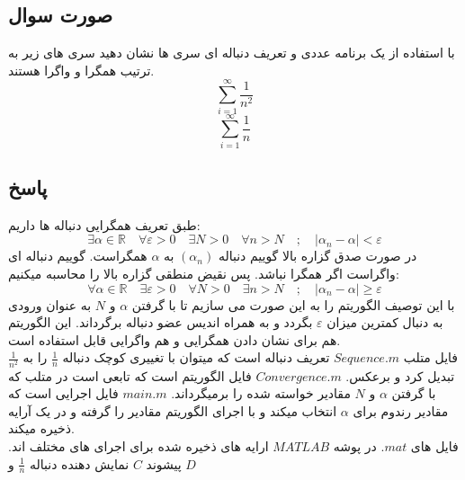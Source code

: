 \documentclass[12pt, letterpaper]{article}
\begin{document}
\subsection{صورت سوال}
با استفاده از یک برنامه عددی و تعریف دنباله ای سری ها نشان دهید سری های زیر به ترتیب همگرا و واگرا هستند.
\[ \sum_{i=1}^{\infty} \frac {1}{n^2}\]
\[ \sum_{i=1}^{\infty} \frac {1}{n}\]



\subsection{پاسخ}

طبق تعریف همگرایی دنباله ها داریم:
\[\exists \! \alpha\! \in\! \mathbb{R} \quad \forall \varepsilon \! > \! 0 \quad \exists N\! > \! 0 \quad \forall n\! >\! N\quad ; \quad \big| \alpha_{n} - \alpha \big|\! <\! \varepsilon \]
در صورت صدق گزاره بالا گوییم دنباله 
\((\alpha_{n})\)
به 
$\alpha$
همگراست. گوییم دنباله ای واگراست اگر همگرا نباشد. پس نقیض منطقی گزاره بالا را محاسبه میکنیم:
\[\forall \! \alpha\! \in\! \mathbb{R} \quad \exists \varepsilon \! > \! 0 \quad \forall N\! > \! 0 \quad \exists n\! >\! N\quad ; \quad \big| \alpha_{n} - \alpha \big|\! \ge\! \varepsilon \]
با این توصیف الگوریتم را به این صورت می سازیم تا با گرفتن 
$\alpha$
 و 
$N$
به عنوان ورودی به دنبال کمترین میزان 
$\varepsilon$
 بگردد و به همراه اندیس عضو دنباله برگرداند. این الگوریتم هم برای نشان دادن همگرایی و هم واگرایی قابل استفاده است.
\\
فایل متلب 
$Sequence.m$
تعریف دنباله است که میتوان با تغییری کوچک دنباله 
$\frac{1}{n}$
را به 
$\frac{1}{n^2}$
 تبدیل کرد و برعکس. 
$Convergence.m$
فایل الگوریتم است که تابعی است در متلب که با گرفتن 
$\alpha$ 
 و 
$N$
مقادیر خواسته شده را برمیگرداند.
$main.m$
 فایل اجرایی است که مقادیر رندوم برای 
$\alpha$
 انتخاب میکند و با اجرای الگوریتم مقادیر را گرفته و در یک آرایه ذخیره میکند.
\\
 فایل های 
$.mat$
در پوشه 
$MATLAB$
 ارایه های ذخیره شده برای اجرای های مختلف اند. پیشوند 
$C$
 نمایش دهنده دنباله 
$\frac{1}{n}$ و $D$
 
\end{document}
